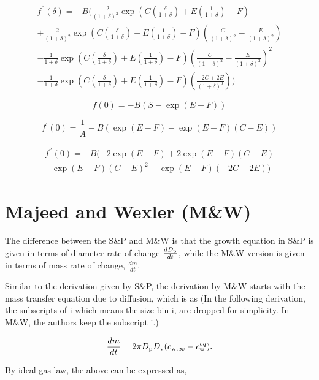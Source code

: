 \documentclass[12pt]{article}
\begin{document}
\begin{eqnarray}
f^{''}(\delta)=-B(\frac{-2}{(1+\delta)^{3}}\exp(C (\frac{\delta}{1+\delta})+E(\frac{1}{1+\delta})-F) \\ \nonumber
+\frac{2}{(1+\delta)^{2}}\exp(C (\frac{\delta}{1+\delta})+E(\frac{1}{1+\delta})-F)(\frac{C}{(1+\delta)^{2}}-\frac{E}{(1+\delta)^{2}}) \\ \nonumber
-\frac{1}{1+\delta}\exp(C (\frac{\delta}{1+\delta})+E(\frac{1}{1+\delta})-F)(\frac{C}{(1+\delta)^{2}}-\frac{E}{(1+\delta)^{2}})^{2} \\ \nonumber
-\frac{1}{1+\delta}\exp(C (\frac{\delta}{1+\delta})+E(\frac{1}{1+\delta})-F)(\frac{-2C+2E}{(1+\delta)^{3}}))
\end{eqnarray}


\begin{equation}
f(0)=-B(S-\exp(E-F))
\end{equation}

\begin{equation}
f^{'}(0)=\frac{1}{A}-B(\exp(E-F)-\exp(E-F)(C-E))
\end{equation}

\begin{eqnarray}
f^{''}(0)=-B(-2\exp(E-F)+2\exp(E-F)(C-E) \\ \nonumber
-\exp(E-F)(C-E)^{2}-\exp(E-F)(-2C+2E))
\end{eqnarray}


\section{Majeed and Wexler (M\&W) }

The difference between the S\&P and M\&W is that the growth equation in S\&P is given in terms of diameter rate of change $\frac{d D_{\rm p}}{dt}$, while the M\&W version is given in terms of mass rate of change, $\frac{dm}{dt}$.

Similar to the derivation given by S\&P, the derivation by M\&W starts with the mass transfer equation due to diffusion, which is as  (In the following derivation, the subscripts of i which means the size bin i,  are dropped for simplicity. In M\&W, the authors keep the subscript i.)

\begin{equation}\label{eqn:18}
\frac{dm}{dt}=2 \pi D_{\rm p} D_{\rm v} (c_{\rm w, \infty} - c_{\rm w}^{eq}).  
\end{equation}

By ideal gas law, the above can be expressed as,
\end{document}
